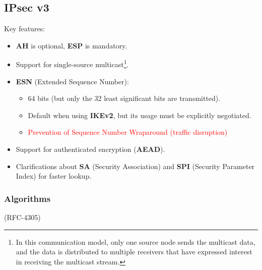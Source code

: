 \subsection{IPsec v3}
Key features:
\begin{itemize}
    \item \textbf{AH} is optional, \textbf{ESP} is mandatory.
    \item Support for single-source multicast\footnote{In this communication model, only one source node sends the multicast data, and the data is distributed to multiple receivers that have expressed interest in receiving the multicast stream.}.
    \item \textbf{ESN} (Extended Sequence Number):
    \begin{itemize}
        \item 64 bits (but only the 32 least significant bits are transmitted).
        \item Default when using \textbf{IKEv2}, but its usage must be explicitly negotiated.
        \item \textcolor{red}{Prevention of Sequence Number Wraparound (traffic disruption)}
    \end{itemize}
    \item Support for authenticated encryption (\textbf{AEAD}).
    \item Clarifications about \textbf{SA} (Security Association) and \textbf{SPI} (Security Parameter Index) for faster lookup.
\end{itemize}

\subsubsection*{Algorithms}
\begin{center}
    (RFC-4305)
\end{center}

